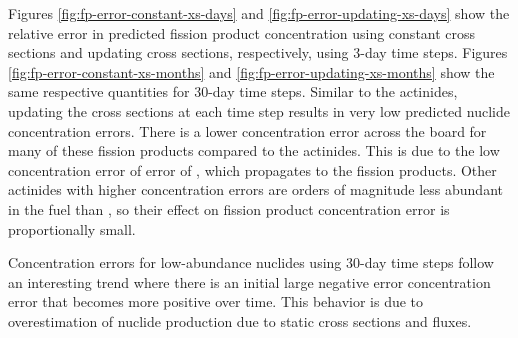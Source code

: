     Figures \ref{fig:fp-error-constant-xs-days} and
    \ref{fig:fp-error-updating-xs-days} show the relative error in predicted
    fission product concentration using constant cross sections and updating
    cross sections, respectively, using 3-day time steps. Figures
    \ref{fig:fp-error-constant-xs-months} and
    \ref{fig:fp-error-updating-xs-months} show the same respective quantities
    for 30-day time steps. Similar to the actinides, updating the cross sections
    at each time step results in very low predicted nuclide concentration
    errors.  There is a lower concentration error across the board for
    many of these fission products compared to the actinides. This is due to the
    low concentration error of error of , which propagates to the
    fission products. Other actinides with higher concentration errors are
    orders of magnitude less abundant in the fuel than , so their
    effect on fission product concentration error is proportionally small.

    Concentration errors for low-abundance nuclides using 30-day time steps follow
    an interesting trend where there is an initial large negative error
    concentration error that becomes more positive over time. This behavior is due
    to overestimation of nuclide production due to static cross sections and
    fluxes.

